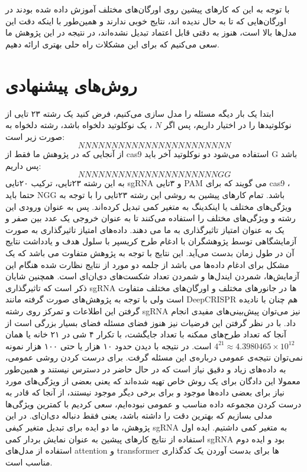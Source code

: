 \documentclass[12pt,a4paper,BCOR=.7cm,headsepline,bibliography=totoc]{report}
\begin{document}
با توجه به این که کار‌های پیشین روی اورگان‌های مختلف آموزش داده شده بودند در اورگان‌هایی که تا به حال ندیده اند، نتایج خوبی ندارند و همین‌طور با اینکه دقت این مدل‌ها بالا است، هنوز به دقتی قابل اعتماد تبدیل نشده‌اند، در نتیجه در این پژوهش ما سعی می‌کنیم که برای این مشکلات راه حلی بهتری ارائه دهیم.

\chapter{روش‌های پیشنهادی}
ابتدا یک بار دیگه مسئله را مدل سازی می‌کنیم، فرض کنید یک رشته ۲۳ تایی از نوکلوتید‌ها را در اختیار داریم، پس اگر $N$ ، یک نوکلوتید دلخواه باشد، رشته دلخواه به صورت زیر است:
$$
NNNNNNNNNNNNNNNNNNNNNNN
$$
از آنجایی که در پژوهش ما فقط از cas9 استفاده می‌شود دو نوکلوتید آخر باید G باشد پس داریم:
$$
NNNNNNNNNNNNNNNNNNNNNGG
$$
به این رشته ۲۳تایی، ترکیب ۲۰‌تایی sgRNA و ۳تایی PAM می گویند که برای cas9 ، حتما باید NGG باشد. 
تمام کارهای پیشین به روشی این رشته ۲۳تایی را با توجه به ویژگی‌های مختلف یا اینکدینگ به متغیر کمی تبدیل کرده‌اند. پس به عنوان ورودی این رشته و ویژگی‌های مختلف را استفاده می‌کنند تا به عنوان خروجی یک عدد بین صفر و یک به عنوان امتیاز تاثیرگذاری به ما می دهند. داده‌های امتیاز تاثیرگذاری به صورت آزمایشگاهی توسط پژوهشگران با ادغام طرح کریسپر با سلول هدف و یادداشت نتایج آن در طول زمان بدست می‌آید. این نتایج با توجه به پژوهش متفاوت می باشد که یک مشکل برای ادغام داده‌ها می باشد از جلمه دو مورد از نتایج نظارت شده هنگام این آزمایش‌ها، شمردن ایندل‌ها و شمردن تعداد شکست‌های دی‌ان‌ای است. همچنین شایان ذکر است که تاثیرگذاری sgRNA ها در جانور‌های مختلف و اورگان‌های مختلف متفاوت است ولی با توجه به پژوهش‌های صورت گرفته مانند DeepCRISPR \cite{DeepCRISPR} هم چنان با نادیده گرفتن این اطلاعات و تمرکز روی رشته sgRNA نیز می‌توان پیش‌بینی‌های مفیدی انجام داد. با در نظر گرفتن این فرضیات نیز هنوز فضای مسئله فضای بسیار بزرگی است از آنجا که تعداد طرح‌های ممکنه با تعداد جایگشت، با تکرار ۴ شی در ۲۱ خانه یا همان 
$4^{21} \approx 4.3980465 \times 10^{12}$
است. در نتیجه با دیدن حدود ۱۰ هزار یا حتی ۱۰۰ هزار نمونه نمی‌توان نتیجه‌ی عمومی درباره‌ی این مسئله گرفت.
برای درست کردن روشی عمومی، به داده‌های زیاد و دقیق نیاز است که در حال حاضر در دسترس نیستند و همین‌طور معمولا این دادگان برای یک روش خاص تهیه شده‌اند که یعنی بعضی از ویژگی‌های مورد نیاز برای بعضی داده‌ها موجود و برای برخی دیگر موجود نیستند، از آنجا که قادر به درست کردن مجموعه داده مناسب و عمومی نبوده‌ایم، سعی کردیم با کمترین ویژگی‌ها مدلی بسازیم که بهترین دقت را داشته باشد، یعنی فقط دنباله دی‌ان‌ای. در این پژوهش، ما دو ایده برای تبدیل متغیر کیفی sgRNA به متغیر کمی داشتیم. ایده اول استفاده از نتایج کار‌های پیشین به عنوان نمایش بردار کمی sgRNA بود و ایده دوم استفاده از مدل‌های attention و transformer ها برای بدست آوردن یک کدگذاری مناسب است.
\end{document}

